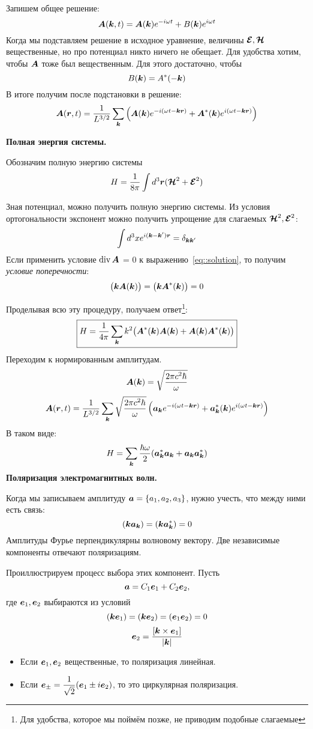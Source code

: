 Запишем общее решение:
$$
     \bf A (\bf k, t) = \bf A(\bf k) e^{-i \omega t} + B(\bf k) e^{i \omega t}
$$
Когда мы подставляем решение в исходное уравнение, величины $\bf \E, \bf \H$ вещественные, но про потенциал никто ничего не обещает. Для удобства хотим, чтобы $\bf A$ тоже был вещественным. Для этого достаточно, чтобы
$$
    B (\bf k) = A^{\ast} (- \bf k)
$$ 
В итоге получим после подстановки в решение:
\begin{equation}
    \bf A(\bf r, t) = \dfrac{1}{L^{3/2}} \sum_{\bf k}
\left(
    \bf A(\bf k) e^{-i(\omega t - \bf k \bf r)} + \bf A^{\ast} (\bf k) e^{i (\omega t - \bf k \bf r)}
\right) 
\label{eq::solution}
\end{equation}

\textbf{Полная энергия системы.}

Обозначим полную энергию системы 
$$
    H = \dfrac{1}{8 \pi} \int d^3 \bf r (\bf \H^2 + \bf \E^2)
$$

Зная потенциал, можно получить полную энергию системы. Из условия ортогональности экспонент можно получить упрощение для слагаемых $\bf \H^2, \bf \E^2$:
$$
    \int d^3 x e^{i (\bf k - \bf k') \bf r} = \dta_{\bf k \bf k'}
$$
Если применить условие $\div \bf A$ = 0 к выражению~\eqref{eq::solution}, то получим \emph{условие поперечности}:
$$
    \big(\bf k \bf A(\bf k)\big) =     \big(\bf k \bf A^{\ast}(\bf k) \big) = 0
$$

Проделывая всю эту процедуру, получаем ответ\footnote{Для удобства, которое мы поймём позже, не приводим подобные слагаемые}:
$$
\boxed{
    H = \dfrac{1}{4 \pi} \sum_{\bf k} k^2 \big(
    \bf A^{\ast} (\bf k) \bf A(\bf k) + 
\bf A (\bf k) \bf A^{\ast}(\bf k)
\big)
}
$$
Переходим к нормированным амплитудам.
$$
    \bf A(\bf k) = \sqrt{\dfrac{2 \pi c^2 \hbar}{\omega}}
$$
$$
    \bf A(\bf r, t) = \dfrac{1}{L^{3/2}} \sum_{\bf k}\sqrt{\dfrac{2 \pi c^2 \hbar}{\omega}}
\left(
    \bf{a}_{\bf k} e^{-i(\omega t - \bf k \bf r)} + \bf{a}_{\bf k}^{\ast} (\bf k) e^{i (\omega t - \bf k \bf r)}
\right)
$$
В таком виде:
$$
    H = \sum_{\bf k} \dfrac{\hbar \omega}{2} 
(
    \bf a_{\bf k}^{\ast} \bf a_{\bf k} + \bf a_{\bf k} \bf a_{\bf k}^{\ast}
)
$$
\textbf{Поляризация электромагнитных волн.}

Когда мы записываем амплитуду $\bf a = \{a_1, a_2, a_3\}$, нужно учесть, что между ними есть связь:
$$
    (\bf k \bf a_{\bf k}) = (\bf k \bf a_{\bf k}^{\ast}) = 0
$$
Амплитуды Фурье перпендикулярны волновому вектору. Две независимые компоненты отвечают поляризациям.

Проиллюстрируем процесс выбора этих компонент. Пусть
$$
    \bf a = C_1 \bf e_1 + C_2 \bf e_2,
$$ 
где $\bf e_1, \bf e_2$ выбираются из условий
$$
    (\bf k \bf e_1) = (\bf k \bf e_2) = (\bf e_1 \bf e_2) = 0
$$
$$
    \bf e_2 = \dfrac{[\bf k \times \bf e_1]}{|\bf k|}
$$
\begin{itemize}
  \item Если $\bf e_1, \bf e_2$ вещественные, то поляризация линейная.
  \item Если $\bf e_{\pm} = \dfrac{1}{\sqrt 2} (\bf e_1 \pm i \bf e_2)$, то это циркулярная поляризация.
\end{itemize}

